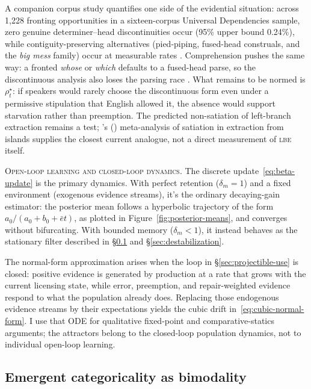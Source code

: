 \documentclass[12pt,letterpaper]{article}
\newcommand{\mention}[1]{\textit{#1}}
\newcommand{\abbr}[1]{\textsc{#1}}
\newcommand{\posscite}[1]{\citeauthor{#1}'s (\citeyear{#1})}
\begin{document}
A companion corpus study quantifies
one side of the evidential situation: across 1{,}228 fronting opportunities in a
sixteen-corpus Universal Dependencies sample, zero genuine determiner--head
discontinuities occur (95\% upper bound 0.24\%), while contiguity-preserving
alternatives (pied-piping, fused-head construals, and the \mention{big mess}
family) occur at measurable rates \autocite{reynolds2026lbe}. Comprehension
pushes the same way: a fronted \mention{whose} or \mention{which} defaults to a
fused-head parse, so the discontinuous analysis also loses the parsing race
\autocite{Culicover_Varaschin_Winkler_2022_Radical}. What remains to be normed
is $\rho_t^\star$: if speakers would rarely choose the discontinuous form even
under a permissive stipulation that English allowed it, the absence would support
starvation rather than preemption. The predicted non-satiation of left-branch
extraction remains a test; \posscite{Lu2024} meta-analysis of
satiation in extraction from islands supplies the closest current analogue, not
a direct measurement of \abbr{lbe} itself.

\noindent\textsc{Open-loop learning and closed-loop dynamics.} The discrete
update~\eqref{eq:beta-update} is the primary dynamics. With perfect retention
($\delta_m=1$) and a fixed environment (exogenous evidence streams), it's the
ordinary decaying-gain estimator: the posterior mean follows a hyperbolic
trajectory of the form $a_0/(a_0+b_0+\bar{e}t)$, as plotted in
Figure~\ref{fig:posterior-means}, and converges without bifurcating. With
bounded memory ($\delta_m<1$), it instead behaves as the stationary filter
described in \S\ref{sec:emergent-categoricality} and
\S\ref{sec:destabilization}.

The normal-form approximation arises when the loop in
\S\ref{sec:projectible-use} is closed: positive evidence is generated by
production at a rate that grows with the current licensing state, while error,
preemption, and repair-weighted evidence respond to what the population already
does. Replacing those endogenous evidence streams by their expectations yields
the cubic drift in~\eqref{eq:cubic-normal-form}. I use that ODE for qualitative
fixed-point and comparative-statics arguments; the attractors belong to the
closed-loop population dynamics, not to individual open-loop learning.

\subsection{Emergent categoricality as bimodality}
\label{sec:emergent-categoricality}
\end{document}
